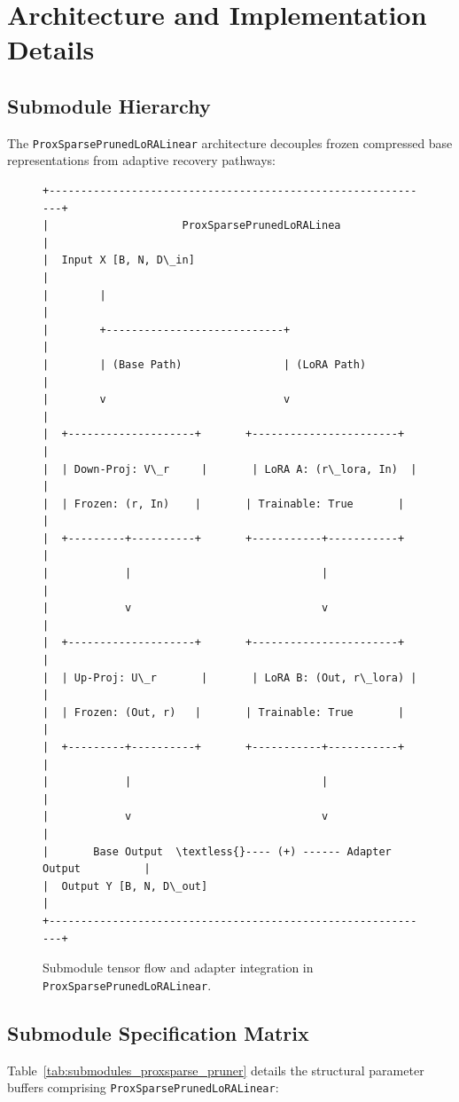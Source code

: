 \section{Architecture and Implementation Details}

\subsection{Submodule Hierarchy}
The \texttt{ProxSparsePrunedLoRALinear} architecture decouples frozen compressed base representations from adaptive recovery pathways:

\begin{figure}[H]
\centering
\begin{verbatim}
+-------------------------------------------------------------+
|                     ProxSparsePrunedLoRALinea               |
|  Input X [B, N, D\_in]                                       |
|        |                                                    |
|        +----------------------------+                       |
|        | (Base Path)                | (LoRA Path)           |
|        v                            v                       |
|  +--------------------+       +-----------------------+     |
|  | Down-Proj: V\_r     |       | LoRA A: (r\_lora, In)  |     |
|  | Frozen: (r, In)    |       | Trainable: True       |     |
|  +---------+----------+       +-----------+-----------+     |
|            |                              |                 |
|            v                              v                 |
|  +--------------------+       +-----------------------+     |
|  | Up-Proj: U\_r       |       | LoRA B: (Out, r\_lora) |     |
|  | Frozen: (Out, r)   |       | Trainable: True       |     |
|  +---------+----------+       +-----------+-----------+     |
|            |                              |                 |
|            v                              v                 |
|       Base Output  \textless{}---- (+) ------ Adapter Output          |
|  Output Y [B, N, D\_out]                                     |
+-------------------------------------------------------------+
\end{verbatim}
\caption{Submodule tensor flow and adapter integration in \texttt{ProxSparsePrunedLoRALinear}.}
\end{figure}

\subsection{Submodule Specification Matrix}
Table~\ref{tab:submodules_proxsparse_pruner} details the structural parameter buffers comprising \texttt{ProxSparsePrunedLoRALinear}:

